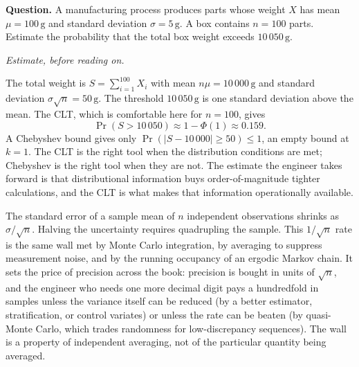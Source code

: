 \begin{estimation}
\textbf{Question.} A manufacturing process produces parts whose
weight $X$ has mean $\mu = 100\,\text{g}$ and standard deviation
$\sigma = 5\,\text{g}$. A box contains $n = 100$ parts. Estimate the
probability that the total box weight exceeds $10\,050\,\text{g}$.

\smallskip
\textit{Estimate, before reading on.}

\smallskip
The total weight is $S = \sum_{i=1}^{100} X_{i}$ with mean $n\mu =
10\,000\,\text{g}$ and standard deviation $\sigma\sqrt{n} = 50\,
\text{g}$. The threshold $10\,050\,\text{g}$ is one standard
deviation above the mean. The CLT, which is comfortable here for
$n = 100$, gives
\[
\Pr(S > 10\,050) \approx 1 - \Phi(1) \approx 0.159.
\]
A Chebyshev bound gives only $\Pr(|S - 10\,000| \geq 50) \leq 1$, an
empty bound at $k = 1$. The CLT is the right tool when the
distribution conditions are met; Chebyshev is the right tool when
they are not. The estimate the engineer takes forward is that
distributional information buys order-of-magnitude tighter
calculations, and the CLT is what makes that information
operationally available.
\end{estimation}

\begin{principle}
The standard error of a sample mean of $n$ independent observations
shrinks as $\sigma/\sqrt{n}$. Halving the uncertainty requires
quadrupling the sample. This $1/\sqrt{n}$ rate is the same wall met
by Monte Carlo integration, by averaging to suppress measurement
noise, and by the running occupancy of an ergodic Markov chain. It
sets the price of precision across the book: precision is bought in
units of $\sqrt{n}$, and the engineer who needs one more decimal
digit pays a hundredfold in samples unless the variance itself can
be reduced (by a better estimator, stratification, or control
variates) or unless the rate can be beaten (by quasi-Monte Carlo,
which trades randomness for low-discrepancy sequences). The wall is
a property of independent averaging, not of the particular quantity
being averaged.
\end{principle}

